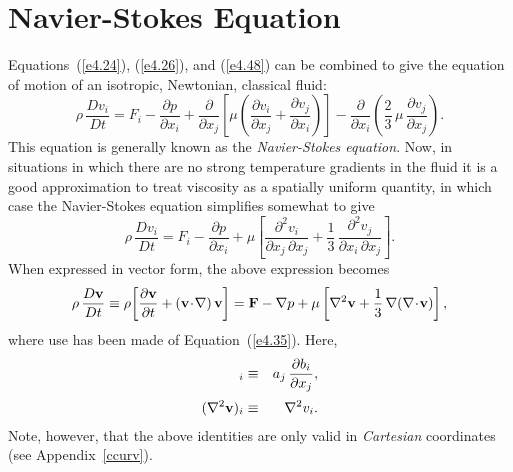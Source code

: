 \section{Navier-Stokes Equation}
Equations~(\ref{e4.24}), (\ref{e4.26}), and (\ref{e4.48}) can be combined to give the equation of motion
of an isotropic, Newtonian, classical fluid:
\begin{equation}
\rho \,\frac{D v_i}{Dt}= F_i - \frac{\partial p}{\partial x_i} + \frac{\partial}{\partial x_j}\!\left[\mu\left(\frac{\partial v_i}{\partial x_j}+ \frac{\partial v_j}{\partial x_i}\right)\right] - \frac{\partial}{\partial x_i}\!\left(\frac{2}{3}\,\mu\,\frac{\partial  v_j}{\partial x_j}\right).
\end{equation}
This equation is generally known as the {\em Navier-Stokes equation}.
Now, in situations in which there are no strong  temperature gradients in the fluid it is a good approximation to treat    viscosity  as a spatially uniform quantity, in which case the
Navier-Stokes equation simplifies
somewhat to give
\begin{equation}
\rho \,\frac{D v_i}{Dt}= F_i - \frac{\partial p}{\partial x_i} +\mu\left[\frac{\partial^2 v_i}{\partial x_j\,\partial x_j}+ \frac{1}{3}\,\frac{\partial^2 v_j}{\partial x_i\,\partial x_j}\right].
\end{equation}
When expressed in vector form, the above expression becomes
\begin{equation}\label{e4.52}
\rho\,\frac{D{\bf v}}{Dt}\equiv \rho\!\left[\frac{\partial {\bf v}}{\partial t} + ({\bf v}\!\cdot\!\nabla)\,{\bf v}\right] = {\bf F} - \nabla p + \mu\left[\nabla^2 {\bf v}
+ \frac{1}{3}\,\nabla(\nabla\!\cdot\!{\bf v})\right],
\end{equation}
where use has been made of Equation~(\ref{e4.35}). Here, 
\begin{eqnarray}
[({\bf a}\!\cdot\!\nabla){\bf b}]_i&\equiv& a_j\,\frac{\partial b_i}{\partial x_j},\label{e4.52x}\\[0.5ex]
(\nabla^2{\bf v})_i &\equiv& \nabla^2 v_i.\label{e4.53}
\end{eqnarray}
Note, however, that the above identities are only valid in {\em Cartesian}\/ coordinates (see Appendix~\ref{ccurv}). 

